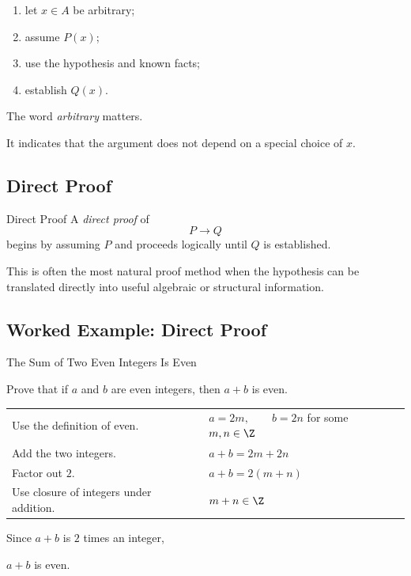 \begin{enumerate}
    \item let \(x\in A\) be arbitrary;
    \item assume \(P(x)\);
    \item use the hypothesis and known facts;
    \item establish \(Q(x)\).
\end{enumerate}

The word \emph{arbitrary} matters.

It indicates that the argument does not depend on a special choice of \(x\).

\subsection{Direct Proof}
\label{subsec:direct-proof}

\begin{definitionbox}{Direct Proof}
A \emph{direct proof} of
\[ P\to Q \]
begins by assuming \(P\) and proceeds logically until \(Q\) is established.
\end{definitionbox}

This is often the most natural proof method when the hypothesis can be
translated directly into useful algebraic or structural information.

\subsection{Worked Example: Direct Proof}
\label{subsec:worked-direct-proof}

\begin{workedexamplebox}{The Sum of Two Even Integers Is Even}

Prove that if \(a\) and \(b\) are even integers, then \(a+b\) is even.

\begin{tabularx}{\textwidth}{@{}>{\raggedright\arraybackslash}p{}X@{}}
Use the definition of even. & \(a=2m,\qquad b=2n\) for some \(m,n\in\Z\)\\
Add the two integers. & \(a+b=2m+2n\)\\
Factor out \(2\). & \(a+b=2(m+n)\)\\
Use closure of integers under addition. & \(m+n\in\Z\)
\end{tabularx}

Since \(a+b\) is \(2\) times an integer,

\begin{answerbox}
\(a+b\) is even.
\end{answerbox}
\end{workedexamplebox}

